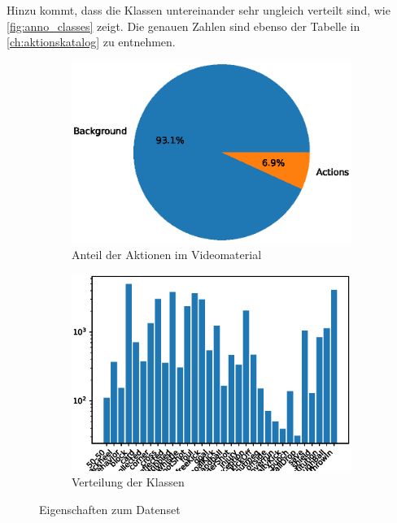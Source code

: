 Hinzu kommt, dass die Klassen untereinander sehr ungleich verteilt sind, wie \autoref{fig:anno_classes} zeigt.
Die genauen Zahlen sind ebenso der Tabelle in \autoref{ch:aktionskatalog} zu entnehmen.

\begin{figure}
    \centering
    \begin{subfigure}{.5\textwidth}
        \centering
        \includegraphics[width=.9\linewidth]{img/data-plots/background_ratio_all_annos.eps}
        \caption{Anteil der Aktionen im Videomaterial}
        \label{fig:anno_bg_ratio}
    \end{subfigure}%
    \begin{subfigure}{.5\textwidth}
        \centering
        \includegraphics[width=.95\linewidth]{img/data-plots/class_distribution_annotations_all.eps}
        \caption{Verteilung der Klassen}
        \label{fig:anno_classes}
    \end{subfigure}
    \caption{Eigenschaften zum Datenset}
    \label{fig:annotations}
\end{figure}


